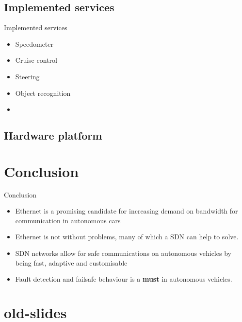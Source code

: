 \documentclass{beamer}
\begin{document}

\subsection{Implemented services}
\begin{frame}{Implemented services}
    \begin{itemize}
        \item Speedometer
        \item Cruise control
        \item Steering
        \item Object recognition
        \item 
    \end{itemize}
\end{frame}

\subsection{Hardware platform}


\section{Conclusion}
\begin{frame}{Conclusion}
    \begin{itemize}
        \item Ethernet is a promising candidate for increasing demand on bandwidth for communication in autonomous cars
        \item Ethernet is not without problems, many of which a SDN can help to solve.
        \item SDN networks allow for safe communications on autonomous vehicles by being fast, adaptive and customisable
        \item Fault detection and failsafe behaviour is a \textbf{must} in autonomous vehicles.
    \end{itemize}

\end{frame}


\section{old-slides}
\end{document}
